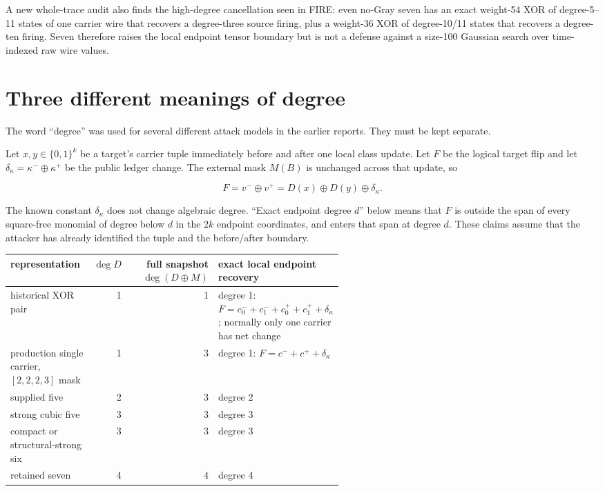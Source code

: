 \documentclass[11pt]{article}
\newcommand{\xor}{\oplus}
\begin{document}
A new whole-trace audit also finds the high-degree cancellation seen in FIRE:
even no-Gray seven has an exact weight-54 XOR of degree-5--11 states of one
carrier wire that recovers a degree-three source firing, plus a weight-36 XOR
of degree-10/11 states that recovers a degree-ten firing.  Seven therefore
raises the local endpoint tensor boundary but is not a defense against a
size-100 Gaussian search over time-indexed raw wire values.

\section{Three different meanings of degree}

The word ``degree'' was used for several different attack models in the earlier
reports.  They must be kept separate.

Let $x,y\in\{0,1\}^k$ be a target's carrier tuple immediately before and after
one local class update.  Let $F$ be the logical target flip and let
$\delta_\kappa=\kappa^-\xor\kappa^+$ be the public ledger change.  The external
mask $M(B)$ is unchanged across that update, so

\begin{equation}
  F=v^-\xor v^+
   =D(x)\xor D(y)\xor\delta_\kappa .
  \label{eq:endpoint-recovery}
\end{equation}

The known constant $\delta_\kappa$ does not change algebraic degree.  ``Exact
endpoint degree $d$'' below means that $F$ is outside the span of every
square-free monomial of degree below $d$ in the $2k$ endpoint coordinates, and
enters that span at degree $d$.  These claims assume that the attacker has
already identified the tuple and the before/after boundary.

\begin{center}
\begin{tabular}{@{}p{0.25\linewidth}rrp{0.31\linewidth}@{}}
\toprule
representation & $\deg D$ & full snapshot $\deg(D\xor M)$ & exact local endpoint recovery \\
\midrule
historical XOR pair & 1 & 1 & degree 1: $F=c_0^-+c_1^-+c_0^++c_1^++\delta_\kappa$; normally only one carrier has net change \\
production single carrier, $[2,2,2,3]$ mask & 1 & 3 & degree 1: $F=c^-+c^++\delta_\kappa$ \\
supplied five & 2 & 3 & degree 2 \\
strong cubic five & 3 & 3 & degree 3 \\
compact or structural-strong six & 3 & 3 & degree 3 \\
retained seven & 4 & 4 & degree 4 \\
\bottomrule
\end{tabular}
\end{center}
\end{document}
